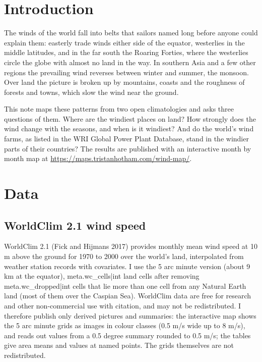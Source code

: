 \documentclass[11pt,a4paper]{article}
\begin{document}
\section{Introduction}

The winds of the world fall into belts that sailors named long before anyone could explain them: easterly trade winds either side of the equator, westerlies in the middle latitudes, and in the far south the Roaring Forties, where the westerlies circle the globe with almost no land in the way. In southern Asia and a few other regions the prevailing wind reverses between winter and summer, the monsoon. Over land the picture is broken up by mountains, coasts and the roughness of forests and towns, which slow the wind near the ground.

This note maps these patterns from two open climatologies and asks three questions of them. Where are the windiest places on land? How strongly does the wind change with the seasons, and when is it windiest? And do the world's wind farms, as listed in the WRI Global Power Plant Database, stand in the windier parts of their countries? The results are published with an interactive month by month map at \url{https://maps.tristanhotham.com/wind-map/}.

\section{Data}

\subsection{WorldClim 2.1 wind speed}
WorldClim 2.1 (Fick and Hijmans 2017) provides monthly mean wind speed at 10 m above the ground for 1970 to 2000 over the world's land, interpolated from weather station records with covariates. I use the 5 arc minute version (about 9 km at the equator), {{meta.wc_cells|int}} land cells after removing {{meta.wc_dropped|int}} cells that lie more than one cell from any Natural Earth land (most of them over the Caspian Sea). WorldClim data are free for research and other non-commercial use with citation, and may not be redistributed. I therefore publish only derived pictures and summaries: the interactive map shows the 5 arc minute grids as images in colour classes (0.5 m/s wide up to 8 m/s), and reads out values from a 0.5 degree summary rounded to 0.5 m/s; the tables give area means and values at named points. The grids themselves are not redistributed.
\end{document}
